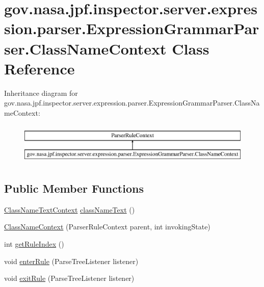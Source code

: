 \hypertarget{classgov_1_1nasa_1_1jpf_1_1inspector_1_1server_1_1expression_1_1parser_1_1_expression_grammar_parser_1_1_class_name_context}{}\section{gov.\+nasa.\+jpf.\+inspector.\+server.\+expression.\+parser.\+Expression\+Grammar\+Parser.\+Class\+Name\+Context Class Reference}
\label{classgov_1_1nasa_1_1jpf_1_1inspector_1_1server_1_1expression_1_1parser_1_1_expression_grammar_parser_1_1_class_name_context}
Inheritance diagram for gov.\+nasa.\+jpf.\+inspector.\+server.\+expression.\+parser.\+Expression\+Grammar\+Parser.\+Class\+Name\+Context\+:\begin{figure}[H]
\begin{center}
\leavevmode
\includegraphics[height=2.000000cm]{classgov_1_1nasa_1_1jpf_1_1inspector_1_1server_1_1expression_1_1parser_1_1_expression_grammar_parser_1_1_class_name_context}
\end{center}
\end{figure}
\subsection*{Public Member Functions}
\begin{DoxyCompactItemize}
\item 
\hyperlink{classgov_1_1nasa_1_1jpf_1_1inspector_1_1server_1_1expression_1_1parser_1_1_expression_grammar_pa73f78f15ab35f00cdc76079d9a864524}{Class\+Name\+Text\+Context} \hyperlink{classgov_1_1nasa_1_1jpf_1_1inspector_1_1server_1_1expression_1_1parser_1_1_expression_grammar_parser_1_1_class_name_context_abd25bb26c1785347d9f66d160f1d0169}{class\+Name\+Text} ()
\item 
\hyperlink{classgov_1_1nasa_1_1jpf_1_1inspector_1_1server_1_1expression_1_1parser_1_1_expression_grammar_parser_1_1_class_name_context_ac6868404de03b8fc92211a3ca97a0002}{Class\+Name\+Context} (Parser\+Rule\+Context parent, int invoking\+State)
\item 
int \hyperlink{classgov_1_1nasa_1_1jpf_1_1inspector_1_1server_1_1expression_1_1parser_1_1_expression_grammar_parser_1_1_class_name_context_a3a970dba10f804046907da6e644e6c1f}{get\+Rule\+Index} ()
\item 
void \hyperlink{classgov_1_1nasa_1_1jpf_1_1inspector_1_1server_1_1expression_1_1parser_1_1_expression_grammar_parser_1_1_class_name_context_a1f0f0a5a591f2076d208a7572a8756af}{enter\+Rule} (Parse\+Tree\+Listener listener)
\item 
void \hyperlink{classgov_1_1nasa_1_1jpf_1_1inspector_1_1server_1_1expression_1_1parser_1_1_expression_grammar_parser_1_1_class_name_context_ac29e2512f8d83c63346197f8785f93a5}{exit\+Rule} (Parse\+Tree\+Listener listener)
\end{DoxyCompactItemize}
